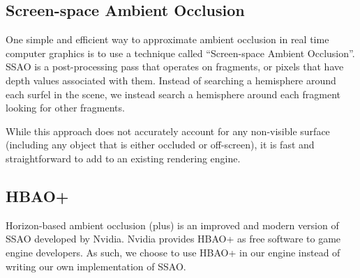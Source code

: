 \subsection{Screen-space Ambient Occlusion}

One simple and efficient way to approximate ambient occlusion in real time computer graphics is to use a technique called ``Screen-space Ambient Occlusion''.
SSAO is a post-processing pass that operates on fragments, or pixels that have depth values associated with them.
Instead of searching a hemisphere around each surfel in the scene, we instead search a hemisphere around each fragment looking for other fragments.

While this approach does not accurately account for any non-visible surface (including any object that is either occluded or off-screen), it is fast and straightforward to add to an existing rendering engine.


\subsection{HBAO+}

Horizon-based ambient occlusion (plus) is an improved and modern version of SSAO developed by Nvidia.
Nvidia provides HBAO+ as free software to game engine developers.
As such, we choose to use HBAO+ in our engine instead of writing our own implementation of SSAO.
